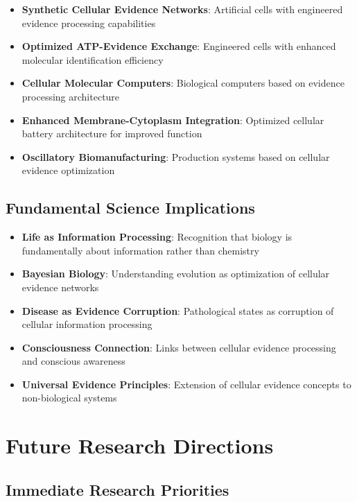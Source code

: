 \documentclass[12pt,a4paper]{article}
\begin{document}
{\begin{itemize}
\item \textbf{Synthetic Cellular Evidence Networks}: Artificial cells with engineered evidence processing capabilities
\item \textbf{Optimized ATP-Evidence Exchange}: Engineered cells with enhanced molecular identification efficiency
\item \textbf{Cellular Molecular Computers}: Biological computers based on evidence processing architecture
\item \textbf{Enhanced Membrane-Cytoplasm Integration}: Optimized cellular battery architecture for improved function
\item \textbf{Oscillatory Biomanufacturing}: Production systems based on cellular evidence optimization
\end{itemize}

\subsection{Fundamental Science Implications}

\begin{itemize}
\item \textbf{Life as Information Processing}: Recognition that biology is fundamentally about information rather than chemistry
\item \textbf{Bayesian Biology}: Understanding evolution as optimization of cellular evidence networks
\item \textbf{Disease as Evidence Corruption}: Pathological states as corruption of cellular information processing
\item \textbf{Consciousness Connection}: Links between cellular evidence processing and conscious awareness
\item \textbf{Universal Evidence Principles}: Extension of cellular evidence concepts to non-biological systems
\end{itemize}

\section{Future Research Directions}

\subsection{Immediate Research Priorities}

}
\end{document}
